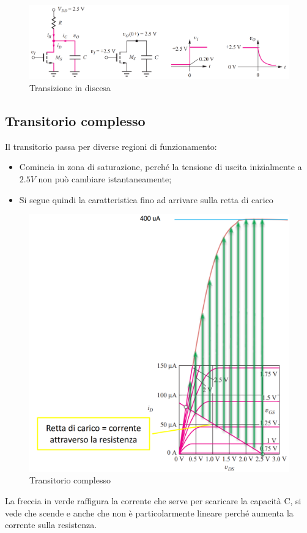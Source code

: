 \begin{figure}[htbp]
    \centering
    \includegraphics[width=1\linewidth]{img/trans_discesa.png}
    \caption{Transizione in discesa}    
\end{figure}


\subsection{Transitorio complesso}

Il transitorio passa per diverse regioni di funzionamento:

\begin{itemize}
    \item Comincia	in	zona	di	saturazione,	perché la	tensione	di	uscita	inizialmente	a	$2.5	V$ non	può	cambiare	istantaneamente;
    \item Si	segue	quindi	la	caratteristica	fino	ad arrivare	sulla	retta	di	carico
\end{itemize}


\begin{figure}[htbp]
    \centering
    \includegraphics[width=0.5\linewidth]{img/retta_car_res.png}
    \caption{Transitorio complesso}
    \label{retta_carico}
\end{figure}

La freccia in verde raffigura la corrente che serve per scaricare la capacità C, si vede che scende e anche che non è particolarmente lineare perché aumenta la corrente sulla resistenza.

